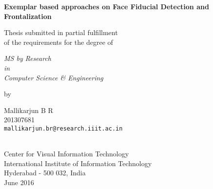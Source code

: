 \thispagestyle{empty}
\begin{center}
\vspace*{1.5cm}
{\Large \bf Exemplar based approaches on Face Fiducial Detection and Frontalization}

\vspace*{3.75cm}
{\large Thesis submitted in partial fulfillment\\}
{\large  of the requirements for the degree of \\}

\vspace*{1cm}
{\it {\large MS by Research} \\
{\large in\\}
{\large Computer Science \& Engineering \\}}

\vspace*{1cm}
{\large by}

\vspace*{5mm}
{\large Mallikarjun B R\\}
{\large 201307681\\
{\small \tt mallikarjun.br@research.iiit.ac.in}}


\vspace*{4.0cm}
{\\}
{\large Center for Visual Information Technology \\}
{\large International Institute of Information Technology\\}
{\large Hyderabad - 500 032, India\\}
{\large June 2016\\}
\end{center}
